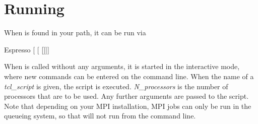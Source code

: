 \section{Running \es}
\label{sec:run}

When \es is found in your path, it can be run via
\begin{code}
Espresso [ [ []]]
\end{code}

 When \es{} is called without any arguments,
it is started in the interactive mode, where new commands can be
entered on the command line. When the name of a \textit{tcl\_script}
is given, the script is executed. \textit{N\_processors} is the number
of processors that are to be used. Any further arguments are passed to
the script. Note that depending on your MPI installation, MPI jobs can
only be run in the queueing system, so that \es will not run from
the command line.



